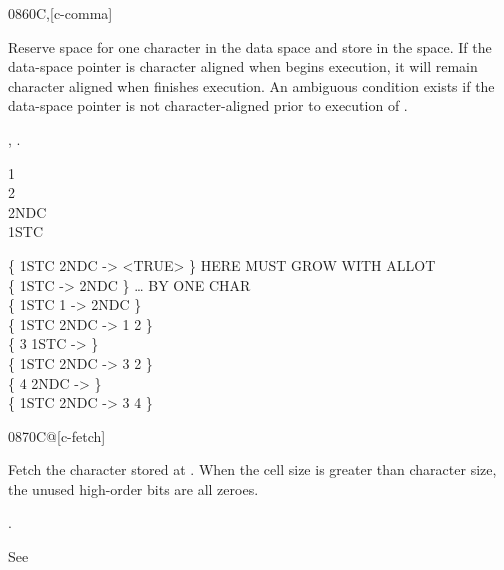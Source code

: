 \begin{worddef}{0860}{C,}[c-comma]
\item {}

	Reserve space for one character in the data space and store
	 in the space. If the data-space pointer is character
	aligned when  begins execution, it will remain character
	aligned when  finishes execution.
	An ambiguous condition exists if the data-space pointer is not
	character-aligned prior to execution of .

\see {},
	.

	\begin{defer}
	\testing
		 1  \\
		 2  \\
		 2NDC \\
		 1STC

		\{ 1STC 2NDC  -> <TRUE> \}	\tab {} HERE MUST GROW WITH ALLOT \\
		\{ 1STC  -> 2NDC \}			\tab[2.6]  {\ldots} BY ONE CHAR \\
		\{ 1STC 1  \word{+} -> 2NDC \} \\
		\{ 1STC  2NDC  -> 1 2 \} \\
		\{ 3 1STC  -> \} \\
		\{ 1STC  2NDC  -> 3 2 \} \\
		\{ 4 2NDC  -> \} \\
		\{ 1STC  2NDC  -> 3 4 \}
	\end{defer}
\end{worddef}


\begin{worddef}{0870}{C@}[c-fetch]
\item {}

	Fetch the character stored at . When the cell size is
	greater than character size, the unused high-order bits are all
	zeroes.

\see {}.

	\begin{defer}
	\testing
		\rmfamily
		See \rref{core:C,}{C,}
	\end{defer}
\end{worddef}


